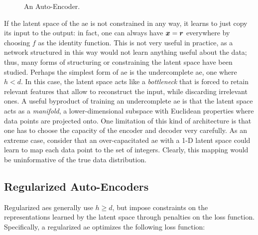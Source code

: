 \begin{figure*}[h!]
    \centering
    \resizebox{.45\textwidth}{!}{}
    \caption{An Auto-Encoder.}
    \label{fig:autoencoder}
\end{figure*}
If the latent space of the \gls{ae} is not constrained in any way, it learns to just copy its input to the output: in fact, one can always have $\Vector{x} = \Vector{r}$ everywhere by choosing $f$ as the identity function. This is not very useful in practice, as a network structured in this way would not learn anything useful about the data; thus, many forms of structuring or constraining the latent space have been studied. Perhaps the simplest form of \gls{ae} is the undercomplete \gls{ae}, \ie one where $h < d$. In this case, the latent space acts like a \emph{bottleneck} that is forced to retain relevant features that allow to reconstruct the input, while discarding irrelevant ones. A useful byproduct of training an undercomplete \gls{ae} is that the latent space acts as a \emph{manifold}, \ie a lower-dimensional subspace with Euclidean properties where data points are projected onto. One limitation of this kind of architecture is that one has to choose the capacity of the encoder and decoder very carefully. As an extreme case, consider that an over-capacitated \gls{ae} with a 1-D latent space could learn to map each data point to the set of integers. Clearly, this mapping would be uninformative of the true data distribution.

\subsection{Regularized Auto-Encoders}
Regularized \glspl{ae} generally use $h \geq d$, but impose constraints on the representations learned by the latent space through penalties on the loss function. Specifically, a regularized \gls{ae} optimizes the following loss function:

